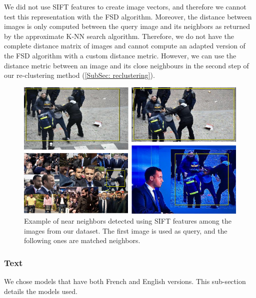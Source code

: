 \begin{enumerate}
    We did not use SIFT features to create image vectors, and therefore we cannot test this representation with the FSD algorithm. Moreover, the distance between images is only computed between the query image and its neighbors as returned by the approximate K-NN search algorithm. Therefore, we do not have the complete distance matrix of images and cannot compute an adapted version of the FSD algorithm with a custom distance metric. However, we can use the distance metric between an image and its close neighbours in the second step of our re-clustering method (\ref{SubSec: reclustering}).
    
\begin{figure}[ht]
  \centering
  \includegraphics[width=\linewidth]{./figures/Benalla.png}
  \caption{Example of near neighbors detected using SIFT features among the images from our dataset. The first image is used as query, and the following ones are matched neighbors.}
  \label{Fig:Benalla}
\end{figure}

\end{enumerate}

\subsubsection{Text}
\label{Subsubsec: text}
We chose models that have both French and English versions. This sub-section details the models used.

